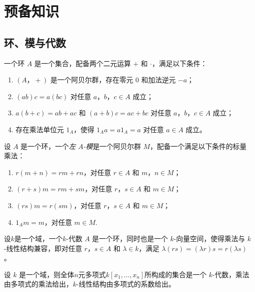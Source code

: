 
\section{预备知识}


\subsection{环、模与代数}
\begin{definition}
    一个环 $A$ 是一个集合，配备两个二元运算 $+$ 和 $\cdot$，满足以下条件：
    \begin{enumerate}[label=(\roman*)]
        \item $(A，+)$ 是一个阿贝尔群，存在零元 $0$ 和加法逆元 $-a$；
        \item  $(ab)c=a(bc)$ 对任意 $a，b，c\in A$ 成立；
        \item  $a(b+c)=ab+ac$ 和 $(a+b)c=ac+bc$ 对任意 $a，b，c\in A$ 成立；
        \item 存在乘法单位元 $1_A$，使得 $1_A a=a 1_A=a$ 对任意 $a\in A$ 成立。
    \end{enumerate}
\end{definition}


\begin{definition}
    设 $A$ 是一个环，一个\emph{左 $A$-模}是一个阿贝尔群 $M$，配备一个满足以下条件的标量乘法：
    \begin{enumerate}[label=(\roman*)]
        \item $r(m+n)=rm+rn$，对任意 $r\in A$ 和 $m，n\in M$；
        \item $(r+s)m=rm+sm$，对任意 $r，s\in A$ 和 $m\in M$；
        \item $(rs)m=r(sm)$，对任意 $r，s\in A$ 和 $m\in M$；
        \item $1_A m=m$，对任意 $m\in M$.
    \end{enumerate}
\end{definition}
\begin{definition}
    设$k$是一个域，一个$k$-代数 $A$ 是一个环，同时也是一个 $k$-向量空间，使得乘法与 $k$-线性结构兼容，即对任意 $r，s\in A$ 和 $\lambda\in k$，满足 $\lambda(rs)=(\lambda r)s=r(\lambda s)$。
\end{definition}
\begin{example}
    设 $k$ 是一个域，则全体$n$元多项式$k[x_1,\ldots,x_n]$所构成的集合是一个 $k$-代数，乘法由多项式的乘法给出，$k$-线性结构由多项式的系数给出。
\end{example}

